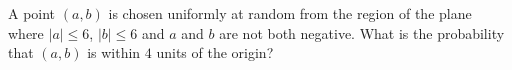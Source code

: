 A point $(a,b)$ is chosen uniformly at random from the region of the plane where $|a|\le6$, $|b|\le6$ and $a$ and $b$ are not both negative. What is the probability that $(a,b)$ is within $4$ units of the origin?
